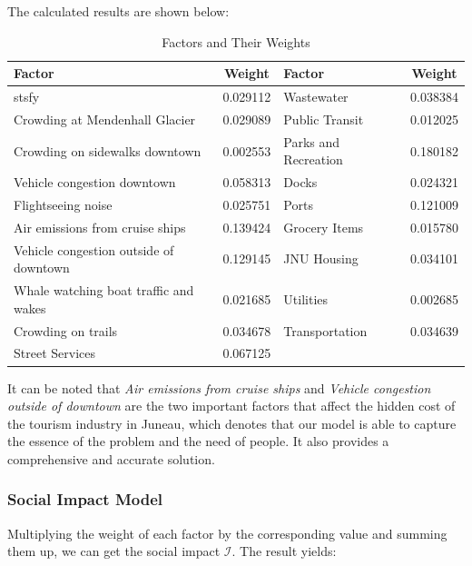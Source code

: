 \vspace{0.5cm}

The calculated results are shown below:

\begin{table}[ht]
    \centering
    \renewcommand{\arraystretch}{1.3}
    \caption{Factors and Their Weights}
    \begin{tabular}{|l|c|l|c|}
    \hline
    \textbf{Factor} & \textbf{Weight} & \textbf{Factor} & \textbf{Weight} \\ \hline
    stsfy & 0.029112 & Wastewater & 0.038384 \\ \hline
    Crowding at Mendenhall Glacier & 0.029089 & Public Transit & 0.012025 \\ \hline
    Crowding on sidewalks downtown & 0.002553 & Parks and Recreation & 0.180182 \\ \hline
    Vehicle congestion downtown & 0.058313 & Docks & 0.024321 \\ \hline
    Flightseeing noise & 0.025751 & Ports & 0.121009 \\ \hline
    Air emissions from cruise ships & 0.139424 & Grocery Items & 0.015780 \\ \hline
    Vehicle congestion outside of downtown & 0.129145 & JNU Housing & 0.034101 \\ \hline
    Whale watching boat traffic and wakes & 0.021685 & Utilities & 0.002685 \\ \hline
    Crowding on trails & 0.034678 & Transportation & 0.034639 \\ \hline
    Street Services & 0.067125 & & \\ \hline
    \end{tabular}
    \end{table}

It can be noted that \textit{Air emissions from cruise ships} and \textit{Vehicle congestion outside of downtown} are the two important factors that affect the hidden cost of the tourism industry in Juneau, 
which denotes that our model is able to capture the essence of the problem and the need of people. It also provides a comprehensive and accurate solution.
    

\subsubsection{Social Impact Model}

Multiplying the weight of each factor by the corresponding value and summing them up, we can get the social impact $\mathcal{I}$.
The result yields:

